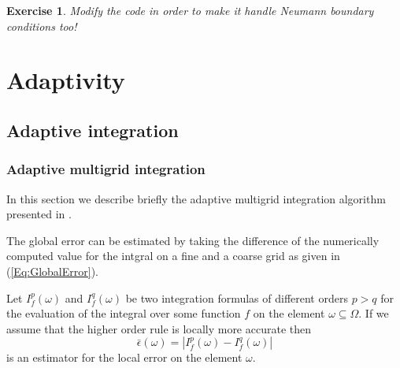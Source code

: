 \documentclass[11pt,a4paper,headinclude,footinclude,DIV16,normalheadings]{scrreprt}
\newtheorem{exc}{Exercise}[chapter]
\begin{document}
\begin{exc}
 Modify the code in order to make it handle Neumann boundary conditions too!
\end{exc}



\chapter{Adaptivity}

\section{Adaptive integration}

\subsection{Adaptive multigrid integration}

In this section we describe briefly the adaptive multigrid integration
algorithm presented in \cite{Deuflhard93}.


The global error can be estimated by taking the difference of the numerically
computed value for the intgral on a fine and a coarse grid as given in
(\ref{Eq:GlobalError}). 


Let $I_f^p(\omega)$ and $I_f^q(\omega)$ be two integration formulas of
different orders $p>q$ for the evaluation of the integral over some
function $f$ on the element $\omega\subseteq\Omega$. If we assume that
the higher order rule is locally more accurate then 
\begin{equation}
\bar{\epsilon}(\omega) = |I_f^p(\omega)-I_f^q(\omega)|
\end{equation}
is an estimator for the local error on the element $\omega$.

\end{document}
